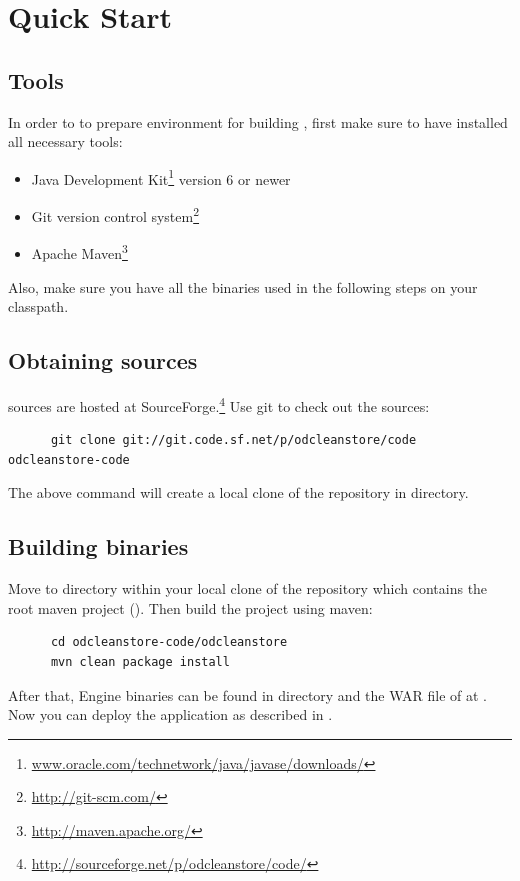\section{Quick Start}
\subsection{Tools}
	In order to to prepare environment for building \odcs, first make sure to have installed all necessary tools:

\begin{itemize}
	\item Java Development Kit\footnote{\url{www.oracle.com/technetwork/java/javase/downloads/}} version 6 or newer
	\item Git version control system\footnote{\url{http://git-scm.com/}}
	\item Apache Maven\footnote{\url{http://maven.apache.org/}}
\end{itemize}

Also, make sure you have all the binaries used in the following steps on your classpath. 

\subsection{Obtaining sources} 
\odcs sources are hosted at SourceForge.\footnote{\url{http://sourceforge.net/p/odcleanstore/code/}} Use git to check out the sources:

\begin{verbatim}
      git clone git://git.code.sf.net/p/odcleanstore/code odcleanstore-code
\end{verbatim}

The above command will create a local clone of the repository in  directory.

\subsection{Building binaries}
Move to directory  within your local clone of the repository which contains the root maven project (). Then build the project using maven:

\begin{verbatim}
      cd odcleanstore-code/odcleanstore
      mvn clean package install
\end{verbatim}

After that, Engine binaries can be found in directory  and the WAR file of \FE at . Now you can deploy the application as described in . 

